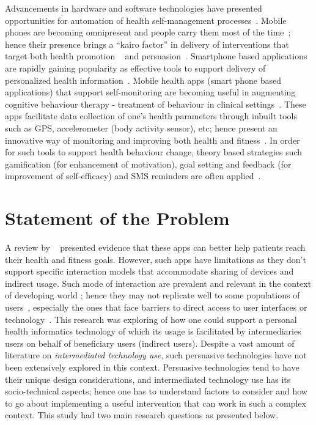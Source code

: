 Advancements in hardware and software technologies have presented opportunities for automation of health self-management processes~\citep{arsand:mobile}. Mobile phones are becoming omnipresent and people carry them most of the time~\citep{mattila2008mobile}; hence their presence brings a ``kairo factor'' in delivery of interventions that target both health promotion ~\citep{pollak2010s} and persuasion~\citep{hsu2014persuasive}. Smartphone based applications are rapidly gaining popularity as effective tools to support delivery of personalized health information~\citep{handel2011mhealth}. Mobile health apps (smart phone based applications) that support self-monitoring are becoming useful in augmenting cognitive behaviour therapy - treatment of behaviour in clinical settings~\citep{mattila2008mobile,medynskiy2010salud}. These apps facilitate data collection of one's health parameters through inbuilt tools such as GPS, accelerometer (body activity sensor), etc; hence present an innovative way of monitoring and improving both health and fitness~\citep{higgins2016smartphone}. In order for such tools to support health behaviour change, theory based strategies such gamification (for enhancement of motivation), goal setting and feedback (for improvement of self-efficacy)  and SMS reminders are often applied~\citep{consolvo2009goal,cole2010text,hamari2014persuasive,hamari2014does,higgins2016smartphone}.
\section{Statement of the Problem}
A review by ~\cite{higgins2016smartphone} presented evidence that these apps can better help patients reach their health and fitness goals.
However, such apps have limitations as they don't support specific interaction models that accommodate sharing of devices and indirect usage. Such mode of interaction are prevalent and relevant in the context of developing world ; hence they may not replicate well to some populations of users~\citep{kaplan2006can,sambasivan2010}, especially the ones that face barriers to direct access to user interfaces or technology~\citep{kumar2015mobile}. This research was exploring of how one could support a personal health informatics technology of which its usage is facilitated by intermediaries users on behalf of beneficiary users (indirect users). Despite a vast amount of literature on \emph{intermediated technology use}, such persuasive technologies have not been extensively explored in this context. Persuasive technologies tend to have their unique design considerations, and intermediated technology use has its socio-technical aspects; hence one has to understand factors to consider and how to go about implementing a useful intervention that can work in such a complex context. This study had two main research questions as presented below. 
